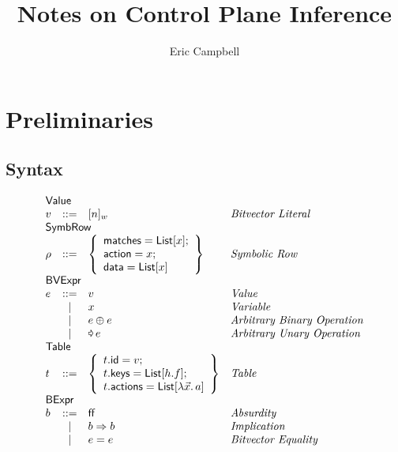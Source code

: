 \documentclass{article}
\title{Notes on Control Plane Inference}
\author{Eric Campbell}
\newcommand{\FALSE}{\mathsf{ff}}
\newcommand{\binop}{\mathbin{\oplus}}
\newcommand{\unop}{\mathop{\text{\pointer}}}
\newcommand{\Value}{\mathsf{Value}}
\newcommand{\BVExpr}{\mathsf{BVExpr}}
\newcommand{\BExpr}{\mathsf{BExpr}}
\newcommand{\Table}{\mathsf{Table}}
\newcommand{\List}{\mathsf{List}}
\newcommand{\SymbRow}{\mathsf{SymbRow}}
\newcommand{\matches}{\mathsf{matches}}
\newcommand{\action}{\mathsf{action}}
\newcommand{\actions}{\mathsf{actions}}
\newcommand{\keys}{\mathsf{keys}}
\newcommand{\data}{\mathsf{data}}
\newcommand{\id}{\mathsf{id}}
\begin{document}
\maketitle

\section{Preliminaries}

\subsection{Syntax}

\begin{figure}[htp]
  \[\begin{array}{lclll}
    \multicolumn{3}{l}{\Value} \\
    v & ::= & [n]_w  & \textit{Bitvector Literal} \\
    \multicolumn{3}{l}{\SymbRow} \\
    \rho & ::= & \left\{
    \begin{array}{l}
      \matches = \List[x];\\
      \action = x;\\
      \data = \List[x]
    \end{array}\right\} & \textit{Symbolic Row} \\
    \multicolumn{3}{l}{\BVExpr} \\
    e & ::= & v & \textit{Value} \\
      & \mid & x & \textit{Variable}\\
      & \mid & e \binop e & \textit{Arbitrary Binary Operation}\\
    & \mid & \unop e & \textit{Arbitrary Unary Operation} \\
    \multicolumn{3}{l}{\Table} \\
    t & ::= & \left\{\begin{array}{l}
    t.\id = v; \\
    t.\keys = \List[h.f]; \\
    t.\actions = \List[\lambda \vec x.\,a]\\
    \end{array}\right\} & \textit{Table}\\
    \multicolumn{3}{l}{\BExpr} \\
    b & ::= & \FALSE  & \textit{Absurdity}\\
      & \mid & b \Rightarrow b & \textit{Implication}\\
    & \mid & e = e & \textit{Bitvector Equality}\\

\end{array}\]
\end{figure}
\end{document}
